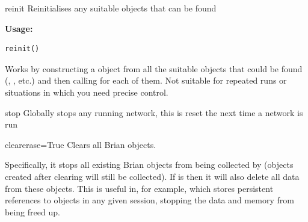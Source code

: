 \documentclass[letterpaper,10pt,english]{manual}
\begin{document}
\hypertarget{brian.reinit}{}\begin{funcdesc}{reinit}{}
Reinitialises any suitable objects that can be found

\textbf{Usage:}

\begin{Verbatim}[commandchars=@\[\]]
reinit()
\end{Verbatim}

Works by constructing a \hyperlink{brian.MagicNetwork}{} object from all the suitable
objects that could be found (\hyperlink{brian.NeuronGroup}{}, \hyperlink{brian.Connection}{}, etc.) and
then calling  for each of them. Not suitable for repeated
runs or situations in which you need precise control.
\end{funcdesc}

\hypertarget{brian.stop}{}\begin{funcdesc}{stop}{}
Globally stops any running network, this is reset the next time a network is run
\end{funcdesc}

\hypertarget{brian.clear}{}\begin{funcdesc}{clear}{erase=True}
Clears all Brian objects.

Specifically, it stops all existing Brian objects from being collected by
\hyperlink{brian.MagicNetwork}{} (objects created after clearing will still be collected).
If  is  then it will also delete all data from these objects.
This is useful in, for example,  which stores persistent references
to objects in any given session, stopping the data and memory from being freed
up.
\end{funcdesc}
\end{document}
